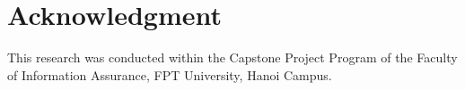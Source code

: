 \section*{Acknowledgment}
This research was conducted within the Capstone Project Program of the Faculty of Information Assurance, FPT University, Hanoi Campus.
